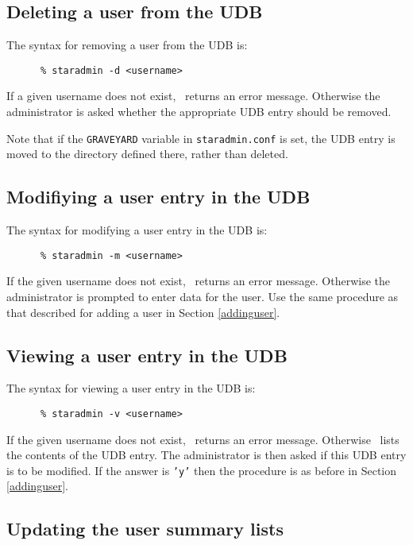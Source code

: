 \subsection{Deleting a user from the UDB}

The syntax for removing a user from the UDB is:

\begin{verbatim}
      % staradmin -d <username>
\end{verbatim}

If a given username does not exist, \staradmin\ returns an error message.
Otherwise the administrator is asked whether the appropriate UDB entry should
be removed.

Note that if the {\tt GRAVEYARD} variable in {\tt staradmin.conf} is set, the
UDB entry is moved to the directory defined there, rather than deleted.

\subsection{Modifiying a user entry in the UDB}

The syntax for modifying a user entry in the UDB is:

\begin{verbatim}
      % staradmin -m <username>
\end{verbatim}

If the given username does not exist, \staradmin\ returns an error message.
Otherwise the administrator is prompted to enter data for the user. Use the 
same procedure as that described for adding a user in Section \ref{addinguser}.

\subsection{Viewing a user entry in the UDB}

The syntax for viewing a user entry in the UDB is:

\begin{verbatim}
      % staradmin -v <username>
\end{verbatim}

If the given username does not exist, \staradmin\ returns an error message.
Otherwise \staradmin\ lists the contents of the UDB entry. The administrator is
then asked if this UDB entry is to be modified. If the answer is {\tt 'y'}
then the procedure is as before in Section \ref{addinguser}.

\subsection{Updating the user summary lists}

